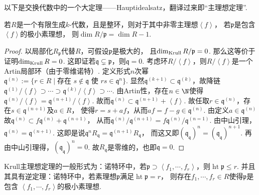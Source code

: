     以下是交换代数中的一个大定理——Hauptidealsatz，翻译过来即“主理想定理”.

    \begin{theorem}[Krull主理想定理]
        若$R$是一个有限生成$k$-代数，且是整环，则对于其中非零主理想$\left<f\right>$，
        若$\mathfrak{p}$是包含$\left<f\right>$的极小素理想，
        则$\dim R/\mathfrak{p} = \dim R - 1$.
    \end{theorem}
    \begin{proof}
        以局部化$R_{\mathfrak{p}}$代替$R$，可假设$\mathfrak{p}$是极大的，
        且$\dim_{\rm Krull} R/\mathfrak{p}=0$. 那么这等价于证明$\dim_{\rm Krull}R=0$. 
        这即证若$\mathfrak{q} \subsetneq \mathfrak{p}$，则$\mathfrak{q}=0$.
        考虑环$R/\left<f\right>$，则$R/\left<f\right>$是一个Artin局部环（由于零维诺特）.
        定义形式$n$次幂$\mathfrak{q}^{(n)}:=\{r \in R\mid \text{存在 }s \notin \mathfrak{q}\text{ 使 }rs\in\mathfrak{q}^{n}\}$. 
        显然$\mathfrak{q}^{(k+1)} \subset \mathfrak{q}^{(k)}$，故降链
        $\mathfrak{q}^{(1)}/\left<f\right> \supset \cdots \supset \mathfrak{q}^{(k)}/\left<f\right> \supset \cdots$.
        由Artin性，存在$n\in \N$使得$\mathfrak{q}^{(n)}/\left<f\right>=\mathfrak{q}^{(n+1)}/\left<f\right>$.
        故而$\mathfrak{q}^{(n)} \subset \mathfrak{q}^{(n+1)}+\left<f\right>$.
        故任取$r \in \mathfrak{q}^{(n)}$，存在$s \in \mathfrak{q}^{(n+1)}$及$a \in R$，
        使得$r=s+af$，从而$af=f-g \in \mathfrak{q}^{(n)}$. 由定义$a \in \mathfrak{q}^{(n)}$
        故$\mathfrak{q}^{(n)} \subset f\mathfrak{q}^{(n)}+\mathfrak{q}^{(n+1)}$，
        从而$\mathfrak{q}^{(n)}/\mathfrak{q}^{(n+1)}=f\mathfrak{q}^{(n)}/\mathfrak{q}^{(n=1)}$. 
        由中山引理，$\mathfrak{q}^{(n)}=\mathfrak{q}^{(n+1)}$.
        这即是说$\mathfrak{q}^{n}R_{\mathfrak{q}}=\mathfrak{q}^{(n+1)}R_{\mathfrak{q}}$，
        而这又即$(\mathfrak{q}_{\mathfrak{q}})^{n}=(\mathfrak{q}_{\mathfrak{q}})^{n+1}$. 
        再由中山引理得，$(\mathfrak{q}_{\mathfrak{q}})^{n}=0$. 故$R_{\mathfrak{q}}$是零维的，也即$\mathfrak{q}=0$.
    \end{proof}

    \begin{remark}
        Krull主理想定理的一般形式为：诺特环中，若$\mathfrak{p} \supset 
        \left<f_{1},\cdots,f_{r}\right>$，则$\operatorname{ht}\mathfrak{p}\leq r$.
        并且其具有逆定理：诺特环中，若素理想$\mathfrak{p}$满足$\operatorname{ht}\mathfrak{p} = r$，
        则存在$f_{1},\cdots,f_{r}\in R$使得$\mathfrak{p}$是包含
        $\left<f_{1},\cdots,f_{r}\right>$的极小素理想.
    \end{remark}

